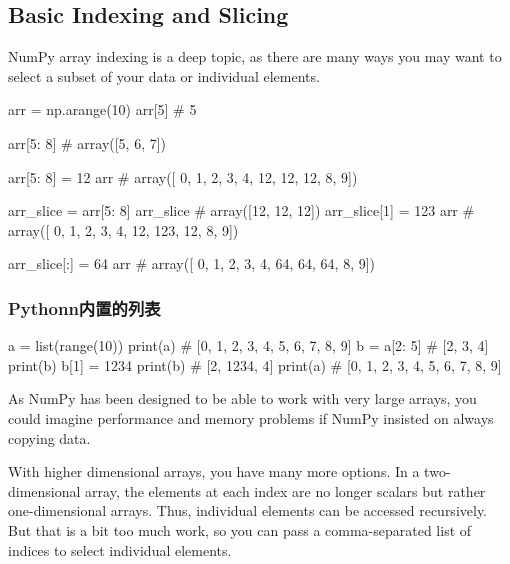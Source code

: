 \subsection{Basic Indexing and Slicing}
NumPy array indexing is a deep topic, as there are many ways you may want to select a subset of your data or individual elements.

\begin{pyc}
arr = np.arange(10)
arr[5]
# 5

arr[5: 8]
# array([5, 6, 7])

arr[5: 8] = 12
arr
# array([ 0,  1,  2,  3,  4, 12, 12, 12,  8,  9])
\end{pyc}

\begin{pyc}
arr_slice = arr[5: 8]
arr_slice
# array([12, 12, 12])
arr_slice[1] = 123
arr
# array([  0,   1,   2,   3,   4,  12, 123,  12,   8,   9])

arr_slice[:] = 64
arr
# array([ 0,  1,  2,  3,  4, 64, 64, 64,  8,  9])
\end{pyc}

\subsubsection{Pythonn内置的列表}
\begin{pyc}
a = list(range(10))
print(a)
# [0, 1, 2, 3, 4, 5, 6, 7, 8, 9]
b = a[2: 5]
# [2, 3, 4]
print(b)
b[1] = 1234
print(b)
# [2, 1234, 4]
print(a)
# [0, 1, 2, 3, 4, 5, 6, 7, 8, 9]
\end{pyc}

As NumPy has been designed to be able to work with very large arrays, you could imagine performance and memory problems if NumPy insisted on always copying data.


With higher dimensional arrays, you have many more options. In a two-dimensional
array, the elements at each index are no longer scalars but rather one-dimensional
arrays. Thus, individual elements can be accessed recursively. But that is a bit too much
work, so you can pass a comma-separated list of indices to select individual elements.

